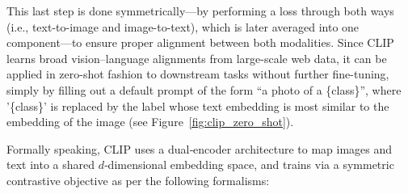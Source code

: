 This last step is done symmetrically---by performing a loss through both ways (i.e., text-to-image and image-to-text), which is later averaged into one component---to ensure proper alignment between both modalities. Since CLIP learns broad vision–language alignments from large-scale web data, it can be applied in zero-shot fashion to downstream tasks without further fine-tuning, simply by filling out a default prompt of the form ``a photo of a \{class\}'', where '\{class\}' is replaced by the label whose text embedding is most similar to the embedding of the image (see Figure~\ref{fig:clip_zero_shot}).

Formally speaking, CLIP uses a dual‑encoder architecture to map images and text into a shared \(d\)‑dimensional embedding space, and trains via a symmetric contrastive objective as per the following formalisms:

